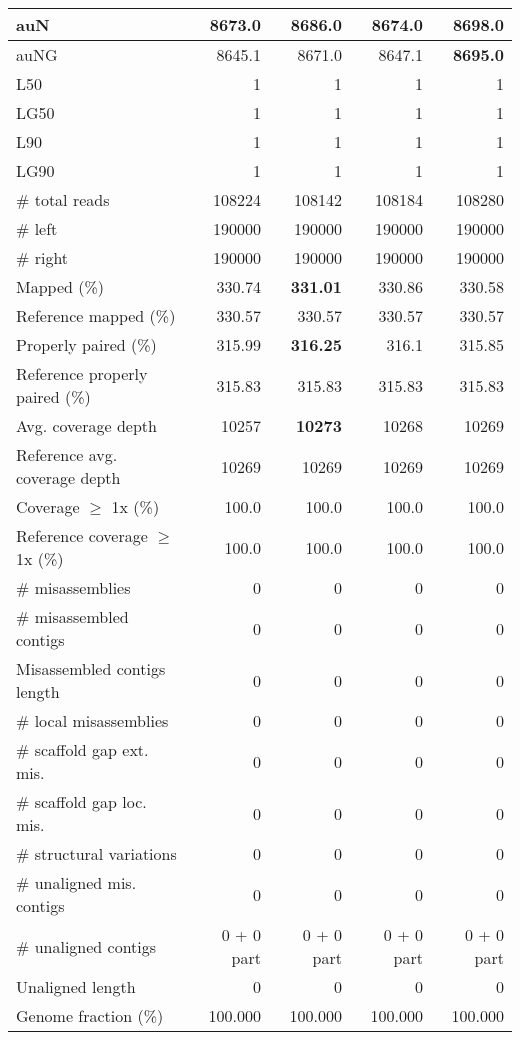 \documentclass[12pt,a4paper]{article}
\begin{document}
\begin{table}[ht]
\begin{center}
\begin{tabular}{|l*{4}{|r}|}
auN & 8673.0 & 8686.0 & 8674.0 & {\bf 8698.0} \\ \hline
auNG & 8645.1 & 8671.0 & 8647.1 & {\bf 8695.0} \\ \hline
L50 & 1 & 1 & 1 & 1 \\ \hline
LG50 & 1 & 1 & 1 & 1 \\ \hline
L90 & 1 & 1 & 1 & 1 \\ \hline
LG90 & 1 & 1 & 1 & 1 \\ \hline
\# total reads & 108224 & 108142 & 108184 & 108280 \\ \hline
\# left & 190000 & 190000 & 190000 & 190000 \\ \hline
\# right & 190000 & 190000 & 190000 & 190000 \\ \hline
Mapped (\%) & 330.74 & {\bf 331.01} & 330.86 & 330.58 \\ \hline
Reference mapped (\%) & 330.57 & 330.57 & 330.57 & 330.57 \\ \hline
Properly paired (\%) & 315.99 & {\bf 316.25} & 316.1 & 315.85 \\ \hline
Reference properly paired (\%) & 315.83 & 315.83 & 315.83 & 315.83 \\ \hline
Avg. coverage depth & 10257 & {\bf 10273} & 10268 & 10269 \\ \hline
Reference avg. coverage depth & 10269 & 10269 & 10269 & 10269 \\ \hline
Coverage $\geq$ 1x (\%) & 100.0 & 100.0 & 100.0 & 100.0 \\ \hline
Reference coverage $\geq$ 1x (\%) & 100.0 & 100.0 & 100.0 & 100.0 \\ \hline
\# misassemblies & 0 & 0 & 0 & 0 \\ \hline
\# misassembled contigs & 0 & 0 & 0 & 0 \\ \hline
Misassembled contigs length & 0 & 0 & 0 & 0 \\ \hline
\# local misassemblies & 0 & 0 & 0 & 0 \\ \hline
\# scaffold gap ext. mis. & 0 & 0 & 0 & 0 \\ \hline
\# scaffold gap loc. mis. & 0 & 0 & 0 & 0 \\ \hline
\# structural variations & 0 & 0 & 0 & 0 \\ \hline
\# unaligned mis. contigs & 0 & 0 & 0 & 0 \\ \hline
\# unaligned contigs & 0 + 0 part & 0 + 0 part & 0 + 0 part & 0 + 0 part \\ \hline
Unaligned length & 0 & 0 & 0 & 0 \\ \hline
Genome fraction (\%) & 100.000 & 100.000 & 100.000 & 100.000 \\ \hline

\end{tabular}
\end{center}
\end{table}
\end{document}
